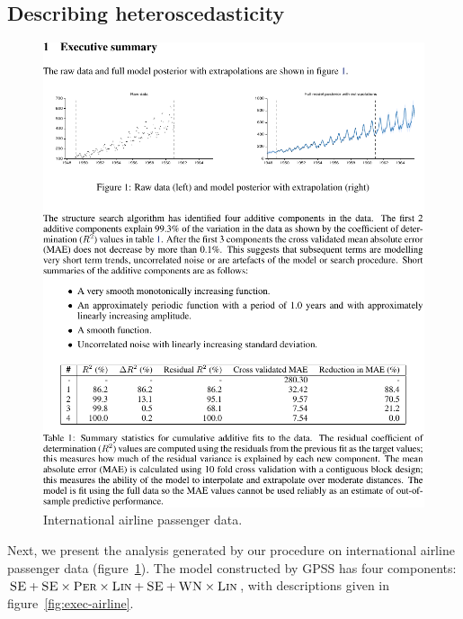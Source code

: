 \documentclass{article}
\def\eg{e.g.\ }
\begin{document}


\subsection{Describing heteroscedasticity}
\label{sec:airline}

\begin{figure}[h]
\centering
\includegraphics[trim=0.4cm 12.5cm 9cm 1.7cm, clip, width=0.98\columnwidth, height=0.55\columnwidth]{airlinepages/01-airline-separate-pages-2}
\caption{
International airline passenger data.}
\label{fig:airline}
\end{figure}

Next, we present the analysis generated by our procedure on international airline passenger data (figure~\ref{fig:airline}).
The model constructed by GPSS has four components: ${\textsc{SE}} + {\textsc{SE}} \times {\textsc{Per}} \times {\textsc{Lin}} + {\textsc{SE}} + {\textsc{WN}} \times {\textsc{Lin}}$, with descriptions given in figure~\ref{fig:exec-airline}.
\end{document}
